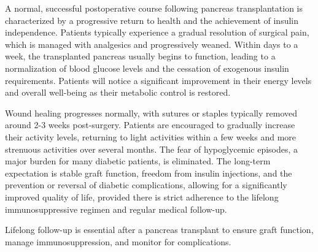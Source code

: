 A normal, successful postoperative course following pancreas transplantation is characterized by a progressive return to health and the achievement of insulin independence. Patients typically experience a gradual resolution of surgical pain, which is managed with analgesics and progressively weaned. Within days to a week, the transplanted pancreas usually begins to function, leading to a normalization of blood glucose levels and the cessation of exogenous insulin requirements. Patients will notice a significant improvement in their energy levels and overall well-being as their metabolic control is restored.

Wound healing progresses normally, with sutures or staples typically removed around 2-3 weeks post-surgery. Patients are encouraged to gradually increase their activity levels, returning to light activities within a few weeks and more strenuous activities over several months. The fear of hypoglycemic episodes, a major burden for many diabetic patients, is eliminated. The long-term expectation is stable graft function, freedom from insulin injections, and the prevention or reversal of diabetic complications, allowing for a significantly improved quality of life, provided there is strict adherence to the lifelong immunosuppressive regimen and regular medical follow-up.

Lifelong follow-up is essential after a pancreas transplant to ensure graft function, manage immunosuppression, and monitor for complications.

